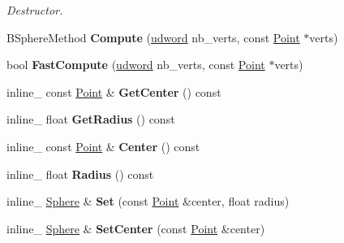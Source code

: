 \begin{DoxyCompactItemize}
\begin{DoxyCompactList}\small\item\em Destructor. \end{DoxyCompactList}\item 
\hypertarget{class_sphere_a7b0327da106f257ef3d8884c40de1c10}{B\+Sphere\+Method {\bfseries Compute} (\hyperlink{_ice_types_8h_a44c6f1920ba5551225fb534f9d1a1733}{udword} nb\+\_\+verts, const \hyperlink{class_point}{Point} $\ast$verts)}\label{class_sphere_a7b0327da106f257ef3d8884c40de1c10}

\item 
\hypertarget{class_sphere_a02626e6da96a9bc369f856c6d59a5fc4}{bool {\bfseries Fast\+Compute} (\hyperlink{_ice_types_8h_a44c6f1920ba5551225fb534f9d1a1733}{udword} nb\+\_\+verts, const \hyperlink{class_point}{Point} $\ast$verts)}\label{class_sphere_a02626e6da96a9bc369f856c6d59a5fc4}

\item 
\hypertarget{class_sphere_ac2be8d9da5fd8d641522de74d7610e11}{inline\+\_\+ const \hyperlink{class_point}{Point} \& {\bfseries Get\+Center} () const }\label{class_sphere_ac2be8d9da5fd8d641522de74d7610e11}

\item 
\hypertarget{class_sphere_a50981ae9e14b9a3eb8d28b3eb706dee5}{inline\+\_\+ float {\bfseries Get\+Radius} () const }\label{class_sphere_a50981ae9e14b9a3eb8d28b3eb706dee5}

\item 
\hypertarget{class_sphere_ad6f248254eda133016e68295e28804ff}{inline\+\_\+ const \hyperlink{class_point}{Point} \& {\bfseries Center} () const }\label{class_sphere_ad6f248254eda133016e68295e28804ff}

\item 
\hypertarget{class_sphere_ad7d5648f647dd5b9f22d020e7565dc2d}{inline\+\_\+ float {\bfseries Radius} () const }\label{class_sphere_ad7d5648f647dd5b9f22d020e7565dc2d}

\item 
\hypertarget{class_sphere_adacae0c5838673b2798184a0a64620e2}{inline\+\_\+ \hyperlink{class_sphere}{Sphere} \& {\bfseries Set} (const \hyperlink{class_point}{Point} \&center, float radius)}\label{class_sphere_adacae0c5838673b2798184a0a64620e2}

\item 
\hypertarget{class_sphere_a220612055a1207030c85a060660d9492}{inline\+\_\+ \hyperlink{class_sphere}{Sphere} \& {\bfseries Set\+Center} (const \hyperlink{class_point}{Point} \&center)}\label{class_sphere_a220612055a1207030c85a060660d9492}


\end{DoxyCompactItemize}
